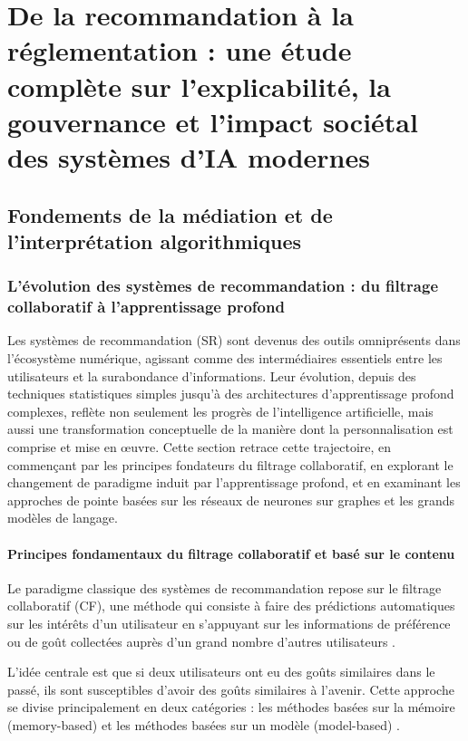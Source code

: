 \part{De la recommandation à la réglementation : une étude complète sur l'explicabilité, la gouvernance et l'impact sociétal des systèmes d'IA modernes}
\chapter{Fondements de la médiation et de l'interprétation algorithmiques}
\section{L'évolution des systèmes de recommandation : du filtrage collaboratif à l'apprentissage profond}
Les systèmes de recommandation (SR) sont devenus des outils omniprésents dans l'écosystème numérique, agissant comme des intermédiaires essentiels entre les utilisateurs et la surabondance d'informations. Leur évolution, depuis des techniques statistiques simples jusqu'à des architectures d'apprentissage profond complexes, reflète non seulement les progrès de l'intelligence artificielle, mais aussi une transformation conceptuelle de la manière dont la personnalisation est comprise et mise en œuvre. Cette section retrace cette trajectoire, en commençant par les principes fondateurs du filtrage collaboratif, en explorant le changement de paradigme induit par l'apprentissage profond, et en examinant les approches de pointe basées sur les réseaux de neurones sur graphes et les grands modèles de langage.
\subsection{Principes fondamentaux du filtrage collaboratif et basé sur le contenu}
Le paradigme classique des systèmes de recommandation repose sur le filtrage collaboratif (CF), une méthode qui consiste à faire des prédictions automatiques sur les intérêts d'un utilisateur en s'appuyant sur les informations de préférence ou de goût collectées auprès d'un grand nombre d'autres utilisateurs \citet{Sarwar2001, Adomavicius2005Toward}. 

L'idée centrale est que si deux utilisateurs ont eu des goûts similaires dans le passé, ils sont susceptibles d'avoir des goûts similaires à l'avenir. Cette approche se divise principalement en deux catégories : les méthodes basées sur la mémoire (memory-based) et les méthodes basées sur un modèle (model-based) \citet{Su2009}.

